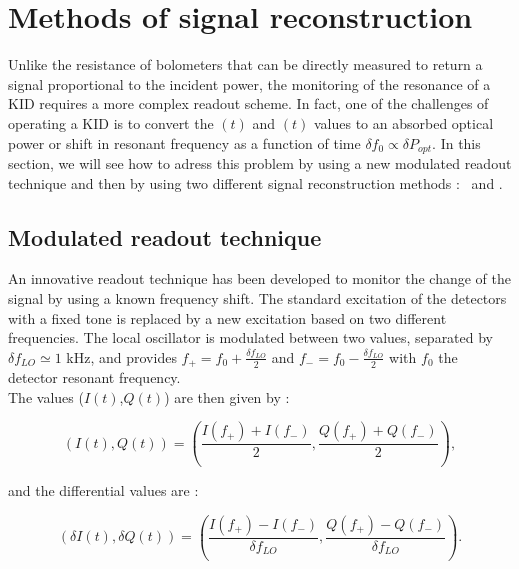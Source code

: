 \section{Methods of signal reconstruction}
\label{sec:signal}

Unlike the resistance of bolometers that can be directly measured to return a signal proportional to the incident power, the monitoring of the resonance of a KID requires a more complex readout scheme. In fact, one of the challenges of operating a KID is to convert the \I$(t)$ and \Q$(t)$ values to an absorbed optical power or shift in resonant frequency as a function of time $\delta f_{0} \propto \delta P_{opt}$. In this
section, we will see how to adress this problem by using a new modulated readout technique and then by using two different signal reconstruction methods : \rf\ and \cf.

\subsection{Modulated readout technique}
An innovative readout technique has been developed to monitor the change of the signal by using a known frequency shift. The standard excitation of the detectors with a fixed tone is replaced by a new excitation based on two different frequencies. The local oscillator is modulated between two values, separated by $\delta f_{LO} \simeq 1$ kHz, and provides $f_{+} = f_{0} + \frac{\delta f_{LO}}{2}$ and $f_{-} = f_{0} - \frac{\delta f_{LO}}{2}$ with $f_{0}$ the detector resonant frequency.\\
The values ($I(t)$,$Q(t)$) are then given by :

\begin{equation}
(I(t),Q(t)) = (\frac{I(f_{+}) + I(f_{-})}{2}, \frac{Q(f_{+}) + Q(f_{-})}{2}),
\end{equation}

and the differential values are :

\begin{equation}
\label{gradient}
(\delta I(t), \delta Q(t)) = (\frac{I(f_{+}) - I(f_{-})}{\delta f_{LO}}, \frac{Q(f_{+}) - Q(f_{-})}{\delta f_{LO}}).
\end{equation}

